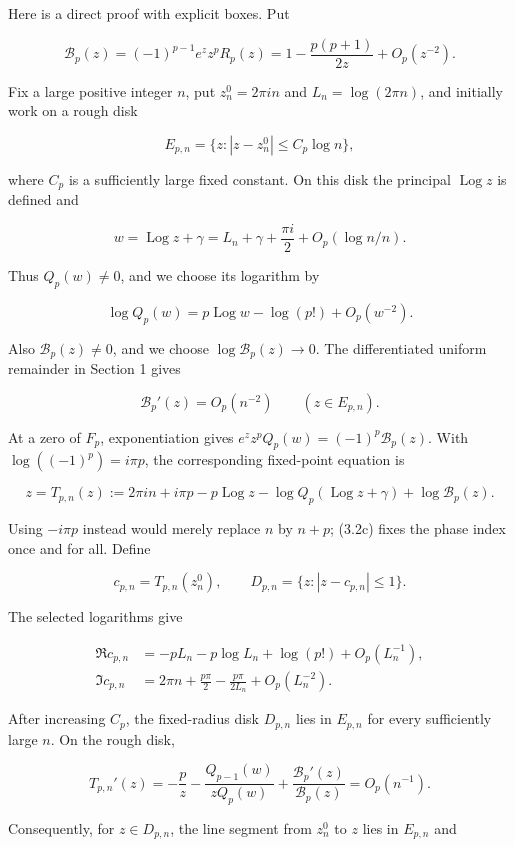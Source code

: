 \documentclass[11pt]{article}
\DeclareMathOperator{\Log}{Log}
\theoremstyle{keio}
\theoremstyle{definition}
\theoremstyle{remark}
\begin{document}
Here is a direct proof with explicit boxes. Put

\[
 \mathcal B_p(z)=(-1)^{p-1}e^z z^pR_p(z)
 =1-\frac{p(p+1)}{2z}+O_p(z^{-2}).
\]

Fix a large positive integer \(n\), put \(z_n^0=2\pi in\) and
\(L_n=\log(2\pi n)\), and initially work on a rough disk

\[
 E_{p,n}=\{z:|z-z_n^0|\leq C_p\log n\},
\tag{Inv-3.2a}
\]

where \(C_p\) is a sufficiently large fixed constant. On this disk the
principal \(\Log z\) is defined and

\[
 w=\Log z+\gamma=L_n+\gamma+\frac{\pi i}{2}
    +O_p(\log n/n).
\]

Thus \(Q_p(w)\ne0\), and we choose its logarithm by

\[
 \log Q_p(w)=p\Log w-\log(p!)+O_p(w^{-2}).
\]

Also \(\mathcal B_p(z)\ne0\), and we choose
\(\log \mathcal B_p(z)\to0\). The differentiated
uniform remainder in Section 1 gives

\[
 \mathcal B_p'(z)=O_p(n^{-2})\qquad (z\in E_{p,n}).
\tag{Inv-3.2b}
\]

At a zero of \(F_p\), exponentiation gives
\(e^zz^pQ_p(w)=(-1)^p\mathcal B_p(z)\). With
\(\log((-1)^p)=i\pi p\), the corresponding fixed-point equation is

\[
 z=T_{p,n}(z):=2\pi in+i\pi p-p\Log z
 -\log Q_p(\Log z+\gamma)+\log \mathcal B_p(z).
\tag{Inv-3.2c}
\]

Using \(-i\pi p\) instead would merely replace \(n\) by \(n+p\); (3.2c)
fixes the phase index once and for all. Define

\[
 c_{p,n}=T_{p,n}(z_n^0),\qquad
 D_{p,n}=\{z:|z-c_{p,n}|\leq1\}.
\tag{Inv-3.2d}
\]

The selected logarithms give

\[
 \begin{aligned}
 \Re c_{p,n}
 &=-pL_n-p\log L_n+\log(p!)+O_p(L_n^{-1}),\\
 \Im c_{p,n}
 &=2\pi n+\frac{p\pi}{2}
   -\frac{p\pi}{2L_n}+O_p(L_n^{-2}).
 \end{aligned}
\tag{Inv-3.2e}
\]

After increasing \(C_p\), the fixed-radius disk \(D_{p,n}\) lies in
\(E_{p,n}\) for every sufficiently large \(n\). On the rough disk,

\[
 T_{p,n}'(z)=-\frac pz
 -\frac{Q_{p-1}(w)}{zQ_p(w)}
 +\frac{\mathcal B_p'(z)}{\mathcal B_p(z)}
 =O_p(n^{-1}).
\tag{Inv-3.2f}
\]

Consequently, for \(z\in D_{p,n}\), the line segment from \(z_n^0\) to
\(z\) lies in \(E_{p,n}\) and
\end{document}
